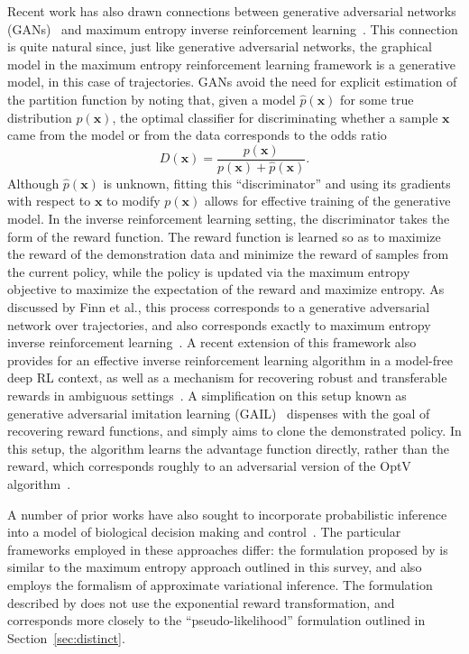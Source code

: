 Recent work has also drawn connections between generative adversarial networks (GANs)~\citep{gan} and maximum entropy inverse reinforcement learning~\citep{gcl,finn_adversarial,airl,gail}. This connection is quite natural since, just like generative adversarial networks, the graphical model in the maximum entropy reinforcement learning framework is a generative model, in this case of trajectories. GANs avoid the need for explicit estimation of the partition function by noting that, given a model $\hat{p}(\mathbf{x})$ for some true distribution $p(\mathbf{x})$, the optimal classifier for discriminating whether a sample $\mathbf{x}$ came from the model or from the data corresponds to the odds ratio
\[
D(\mathbf{x}) = \frac{p(\mathbf{x})}{p(\mathbf{x}) + \hat{p}(\mathbf{x})}.
\]
Although $\hat{p}(\mathbf{x})$ is unknown, fitting this ``discriminator'' and using its gradients with respect to $\mathbf{x}$ to modify $p(\mathbf{x})$ allows for effective training of the generative model. In the inverse reinforcement learning setting, the discriminator takes the form of the reward function. The reward function is learned so as to maximize the reward of the demonstration data and minimize the reward of samples from the current policy, while the policy is updated via the maximum entropy objective to maximize the expectation of the reward and maximize entropy. As discussed by Finn et al., this process corresponds to a generative adversarial network over trajectories, and also corresponds exactly to maximum entropy inverse reinforcement learning~\citep{finn_adversarial}. A recent extension of this framework also provides for an effective inverse reinforcement learning algorithm in a model-free deep RL context, as well as a mechanism for recovering robust and transferable rewards in ambiguous settings~\citep{airl}. A simplification on this setup known as generative adversarial imitation learning (GAIL)~\citep{gail} dispenses with the goal of recovering reward functions, and simply aims to clone the demonstrated policy. In this setup, the algorithm learns the advantage function directly, rather than the reward, which corresponds roughly to an adversarial version of the OptV algorithm~\citep{ldmp_irl}.

A number of prior works have also sought to incorporate probabilistic inference into a model of biological decision making and control~\citep{solway,botvinick,bottoussaint,friston}. The particular frameworks employed in these approaches differ: the formulation proposed by \citet{friston} is similar to the maximum entropy approach outlined in this survey, and also employs the formalism of approximate variational inference. The formulation described by \citet{bottoussaint} does not use the exponential reward transformation, and corresponds more closely to the ``pseudo-likelihood'' formulation outlined in Section~\ref{sec:distinct}.

